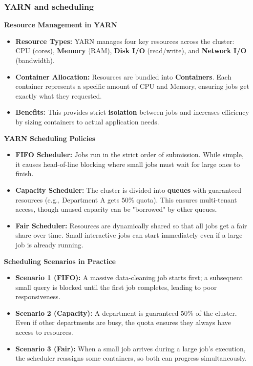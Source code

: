 \subsubsection{YARN and scheduling}

\textbf{Resource Management in YARN}\begin{itemize}\item \textbf{Resource Types:} YARN manages four key resources across the cluster: $\text{CPU}$ (cores), \textbf{Memory} (RAM), \textbf{Disk I/O} (read/write), and \textbf{Network I/O} (bandwidth).\item \textbf{Container Allocation:} Resources are bundled into \textbf{Containers}. Each container represents a specific amount of $\text{CPU}$ and Memory, ensuring jobs get exactly what they requested.\item \textbf{Benefits:} This provides strict \textbf{isolation} between jobs and increases efficiency by sizing containers to actual application needs.\end{itemize}\textbf{ YARN Scheduling Policies}\begin{itemize}\item \textbf{FIFO Scheduler:} Jobs run in the strict order of submission. While simple, it causes head-of-line blocking where small jobs must wait for large ones to finish.\item \textbf{Capacity Scheduler:} The cluster is divided into \textbf{queues} with guaranteed resources (e.g., Department A gets $50\%$ quota). This ensures multi-tenant access, though unused capacity can be "borrowed" by other queues.\item \textbf{Fair Scheduler:} Resources are dynamically shared so that all jobs get a fair share over time. Small interactive jobs can start immediately even if a large job is already running.\end{itemize}\textbf{ Scheduling Scenarios in Practice}\begin{itemize}\item \textbf{Scenario 1 (FIFO):} A massive data-cleaning job starts first; a subsequent small query is blocked until the first job completes, leading to poor responsiveness.\item \textbf{Scenario 2 (Capacity):} A department is guaranteed $50\%$ of the cluster. Even if other departments are busy, the quota ensures they always have access to resources.\item \textbf{Scenario 3 (Fair):} When a small job arrives during a large job's execution, the scheduler reassigns some containers, so both can progress simultaneously.\end{itemize}

